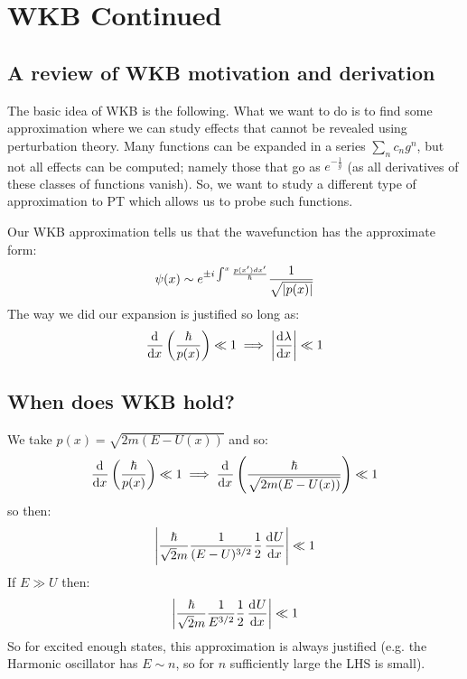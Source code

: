 \section{WKB Continued}
\subsection{A review of WKB motivation and derivation}
The basic idea of WKB is the following. What we want to do is to find some approximation where we can study effects that cannot be revealed using perturbation theory. Many functions can be expanded in a series $\sum_n c_n g^n$, but not all effects can be computed; namely those that go as $e^{-\frac{1}{g}}$ (as all derivatives of these classes of functions vanish). So, we want to study a different type of approximation to PT which allows us to probe such functions.

Our WKB approximation tells us that the wavefunction has the approximate form:
\begin{equation}
    \psi(x) \sim e^{\pm i \int^x \frac{p(x')dx'}{\hbar}} \frac{1}{\sqrt{\lvert p(x) \rvert}}
\end{equation}
The way we did our expansion is justified so long as:
\begin{equation}
    \dod{}{x}\left(\frac{\hbar}{p(x)}\right) \ll 1 \implies \left| \dod{\lambda}{x}\right| \ll 1
\end{equation}

\subsection{When does WKB hold?}
We take $p(x) = \sqrt{2m(E - U(x))}$ and so:
\begin{equation}
    \dod{}{x}\left(\frac{\hbar}{p(x)}\right) \ll 1 \implies \dod{}{x}\left(\frac{\hbar}{\sqrt{2m(E - U(x))}}\right) \ll 1
\end{equation}
so then:
\begin{equation}
    \left|\frac{\hbar}{\sqrt{2}m}\frac{1}{(E - U)^{3/2}}\frac{1}{2}\dod{U}{x}\right| \ll 1
\end{equation}
If $E \gg U$ then:
\begin{equation}
    \left|\frac{\hbar}{\sqrt{2}m}\frac{1}{E^{3/2}}\frac{1}{2}\dod{U}{x}\right| \ll 1
\end{equation}
So for excited enough states, this approximation is always justified (e.g. the Harmonic oscillator has $E \sim n$, so for $n$ sufficiently large the LHS is small).

\begin{figure}[htpb]
    \centering

    \caption{}
    \label{}
\end{figure}

